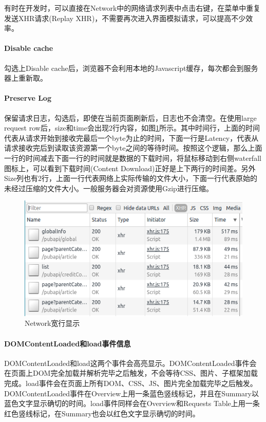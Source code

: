 \documentclass[letter]{book}
\begin{document}
有时在开发时，可以直接在Network中的网络请求列表中点击右键，在菜单中重复发送XHR请求(Replay XHR)，不需要再次进入界面模拟请求，可以提高不少效率。

\paragraph{Disable cache}

勾选上Disable cache后，浏览器不会利用本地的Javascript缓存，每次都会到服务器上重新取。

\paragraph{Preserve Log}

保留请求日志，勾选后，即使在当前页面刷新后，日志也不会清空。在使用large request row后，size和time会出现2行内容，如图\ref{fig:networksizeandtime}所示。其中时间行，上面的时间代表从请求开始到接收完最后一个byte为止的时间，下面一行是Latency，代表从请求接收完后到读取该资源第一个byte之间的等待时间。按照这个逻辑，那么上面一行的时间减去下面一行的时间就是数据的下载时间，将鼠标移动到右侧waterfall图标上，可以看到下载时间(Content Download)正好是上下两行的时间差。另外Size列也有2行，上面一行代表网络上实际传输的文件大小，下面一行代表原始的未经过压缩的文件大小。一般服务器会对资源使用Gzip进行压缩。

\begin{figure}[htbp]
	\centering
	\includegraphics[scale=0.6]{networksizeandtime.png}
	\caption{Network宽行显示}
	\label{fig:networksizeandtime}
\end{figure}

\paragraph{DOMContentLoaded和load事件信息}

DOMContentLoaded和load这两个事件会高亮显示。DOMContentLoaded事件会在页面上DOM完全加载并解析完毕之后触发，不会等待CSS、图片、子框架加载完成。load事件会在页面上所有DOM、CSS、JS、图片完全加载完毕之后触发。DOMContentLoaded事件在Overview上用一条蓝色竖线标记，并且在Summary以蓝色文字显示确切的时间。load事件同样会在Overview和Requests Table上用一条红色竖线标记，在Summary也会以红色文字显示确切的时间。
\end{document}

